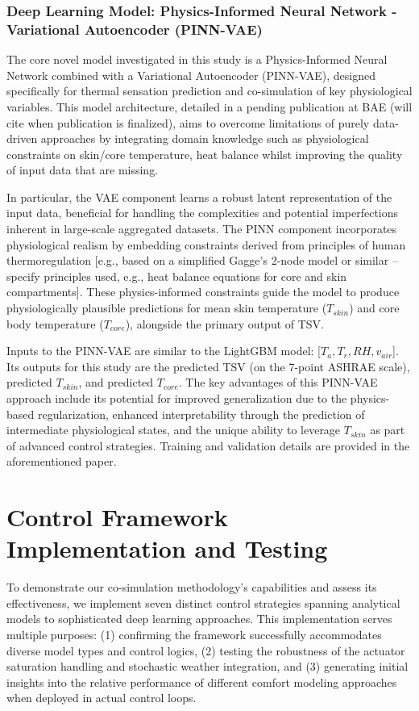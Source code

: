 \subsubsection{Deep Learning Model: Physics-Informed Neural Network - Variational Autoencoder (PINN-VAE)}
\label{sec:pinn_vae_model}
The core novel model investigated in this study is a Physics-Informed Neural Network combined with a Variational Autoencoder (PINN-VAE), designed specifically for thermal sensation prediction and co-simulation of key physiological variables. This model architecture, detailed in a pending publication at BAE (will cite when publication is finalized), aims to overcome limitations of purely data-driven approaches by integrating domain knowledge such as physiological constraints on skin/core temperature, heat balance whilst improving the quality of input data that are missing.

In particular, the VAE component learns a robust latent representation of the input data, beneficial for handling the complexities and potential imperfections inherent in large-scale aggregated datasets. The PINN component incorporates physiological realism by embedding constraints derived from principles of human thermoregulation [e.g., based on a simplified Gagge's 2-node model  or similar -- specify principles used, e.g., heat balance equations for core and skin compartments]. These physics-informed constraints guide the model to produce physiologically plausible predictions for mean skin temperature ($T_{skin}$) and core body temperature ($T_{core}$), alongside the primary output of TSV.

Inputs to the PINN-VAE are similar to the LightGBM model: [$T_a, T_r, RH, v_{air}$]. Its outputs for this study are the predicted TSV (on the 7-point ASHRAE scale), predicted $T_{skin}$, and predicted $T_{core}$. The key advantages of this PINN-VAE approach include its potential for improved generalization due to the physics-based regularization, enhanced interpretability through the prediction of intermediate physiological states, and the unique ability to leverage $T_{skin}$ as part of advanced control strategies. Training and validation details are provided in the aforementioned paper.

\section{Control Framework Implementation and Testing}
To demonstrate our co-simulation methodology's capabilities and assess its effectiveness, we implement seven distinct control strategies spanning analytical models to sophisticated deep learning approaches. This implementation serves multiple purposes: (1) confirming the framework successfully accommodates diverse model types and control logics, (2) testing the robustness of the actuator saturation handling and stochastic weather integration, and (3) generating initial insights into the relative performance of different comfort modeling approaches when deployed in actual control loops.

